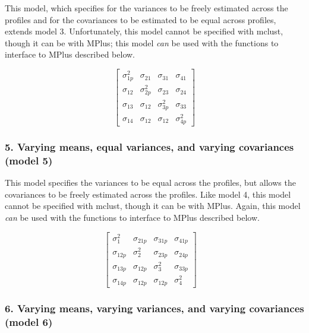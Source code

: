 \documentclass[]{msu-thesis}
\theoremstyle{definition}
\theoremstyle{definition}
\theoremstyle{definition}
\theoremstyle{remark}
\begin{document}
This model, which specifies for the variances to be freely estimated
across the profiles and for the covariances to be estimated to be equal
across profiles, extends model 3. Unfortunately, this model cannot be
specified with mclust, though it can be with MPlus; this model
\emph{can} be used with the functions to interface to MPlus described
below.

\[
\left[ \begin{matrix} { \sigma  }_{ 1p }^{ 2 } & { \sigma  }_{ 21 } & { \sigma  }_{ 31 } & { \sigma  }_{ 41 } \\ { \sigma  }_{ 12 } & { \sigma  }_{ 2p }^{ 2 } & { \sigma  }_{ 23 } & { \sigma  }_{ 24 } \\ { \sigma  }_{ 13 } & { \sigma  }_{ 12 } & { \sigma  }_{ 3p }^{ 2 } & { \sigma  }_{ 33 } \\ { \sigma  }_{ 14 } & { \sigma  }_{ 12 } & { \sigma  }_{ 12 } & { \sigma  }_{ 4p }^{ 2 } \end{matrix} \right] 
\]

\subsubsection{5. Varying means, equal variances, and varying
covariances (model
5)}\label{varying-means-equal-variances-and-varying-covariances-model-5}

This model specifies the variances to be equal across the profiles, but
allows the covariances to be freely estimated across the profiles. Like
model 4, this model cannot be specified with mclust, though it can be
with MPlus. Again, this model \emph{can} be used with the functions to
interface to MPlus described below.

\[
\left[ \begin{matrix} { \sigma  }_{ 1 }^{ 2 } & { \sigma  }_{ 21p } & { \sigma  }_{ 31p } & { \sigma  }_{ 41p } \\ { \sigma  }_{ 12p } & { \sigma  }_{ 2 }^{ 2 } & { \sigma  }_{ 23p } & { \sigma  }_{ 24p } \\ { \sigma  }_{ 13p } & { \sigma  }_{ 12p } & { \sigma  }_{ 3 }^{ 2 } & { \sigma  }_{ 33p } \\ { \sigma  }_{ 14p } & { \sigma  }_{ 12p } & { \sigma  }_{ 12p } & { \sigma  }_{ 4 }^{ 2 } \end{matrix} \right] \quad 
\]

\subsubsection{6. Varying means, varying variances, and varying
covariances (model
6)}\label{varying-means-varying-variances-and-varying-covariances-model-6}
\end{document}
